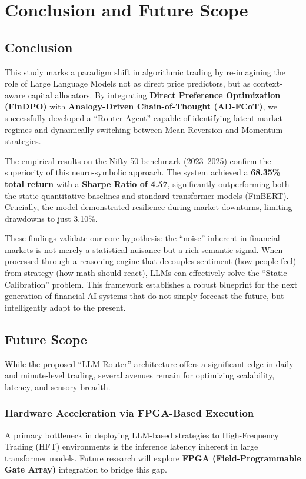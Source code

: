 \documentclass[12pt, a4paper]{report}
\begin{document}
\chapter{Conclusion and Future Scope}

\section{Conclusion}

This study marks a paradigm shift in algorithmic trading by re-imagining the role of Large Language Models not as direct price predictors, but as context-aware capital allocators. By integrating \textbf{Direct Preference Optimization (FinDPO)} with \textbf{Analogy-Driven Chain-of-Thought (AD-FCoT)}, we successfully developed a ``Router Agent'' capable of identifying latent market regimes and dynamically switching between Mean Reversion and Momentum strategies.

The empirical results on the Nifty 50 benchmark (2023–2025) confirm the superiority of this neuro-symbolic approach. The system achieved a \textbf{68.35\% total return} with a \textbf{Sharpe Ratio of 4.57}, significantly outperforming both the static quantitative baselines and standard transformer models (FinBERT). Crucially, the model demonstrated resilience during market downturns, limiting drawdowns to just 3.10\%.

These findings validate our core hypothesis: the ``noise'' inherent in financial markets is not merely a statistical nuisance but a rich semantic signal. When processed through a reasoning engine that decouples sentiment (how people feel) from strategy (how math should react), LLMs can effectively solve the ``Static Calibration'' problem. This framework establishes a robust blueprint for the next generation of financial AI systems that do not simply forecast the future, but intelligently adapt to the present.

\section{Future Scope}

While the proposed ``LLM Router'' architecture offers a significant edge in daily and minute-level trading, several avenues remain for optimizing scalability, latency, and sensory breadth.

\subsection{Hardware Acceleration via FPGA-Based Execution}
A primary bottleneck in deploying LLM-based strategies to High-Frequency Trading (HFT) environments is the inference latency inherent in large transformer models. Future research will explore \textbf{FPGA (Field-Programmable Gate Array)} integration to bridge this gap.
\end{document}
